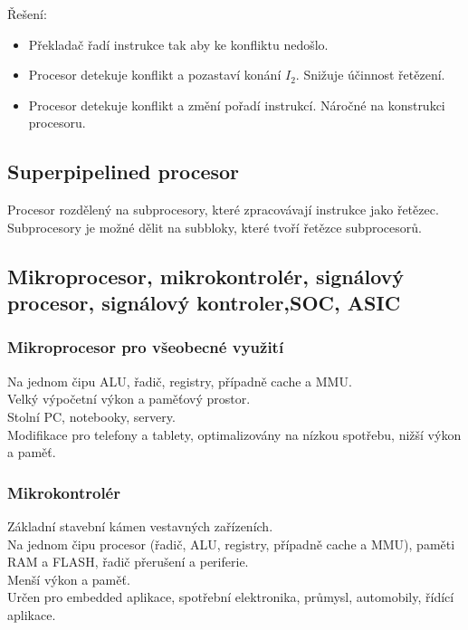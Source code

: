 Řešení:
\begin{itemize}
    \item Překladač řadí instrukce tak aby ke konfliktu nedošlo.
    \item Procesor detekuje konflikt a pozastaví konání $I_2$. Snižuje účinnost řetězení.
    \item Procesor detekuje konflikt a změní pořadí instrukcí. Náročné na konstrukci procesoru.
\end{itemize}

\subsection{Superpipelined procesor}
Procesor rozdělený na subprocesory, které zpracovávají instrukce jako řetězec. \\
Subprocesory je možné dělit na subbloky, které tvoří řetězce subprocesorů. \\

\subsection{Mikroprocesor, mikrokontrolér, signálový procesor, signálový kontroler,SOC, ASIC}
\subsubsection{Mikroprocesor pro všeobecné využití}
Na jednom čipu ALU, řadič, registry, případně cache a MMU.\\
Velký výpočetní výkon a paměťový prostor.\\
Stolní PC, notebooky, servery.\\
Modifikace pro telefony a tablety, optimalizovány na nízkou spotřebu, nižší výkon a paměť. \\

\subsubsection*{Mikrokontrolér}
Základní stavební kámen vestavných zařízeních. \\
Na jednom čipu procesor (řadič, ALU, registry, případně cache a MMU), paměti RAM a FLASH, řadič přerušení a periferie.\\
Menší výkon a paměť.\\
Určen pro embedded aplikace, spotřební elektronika, průmysl, automobily, řídící aplikace. \\

